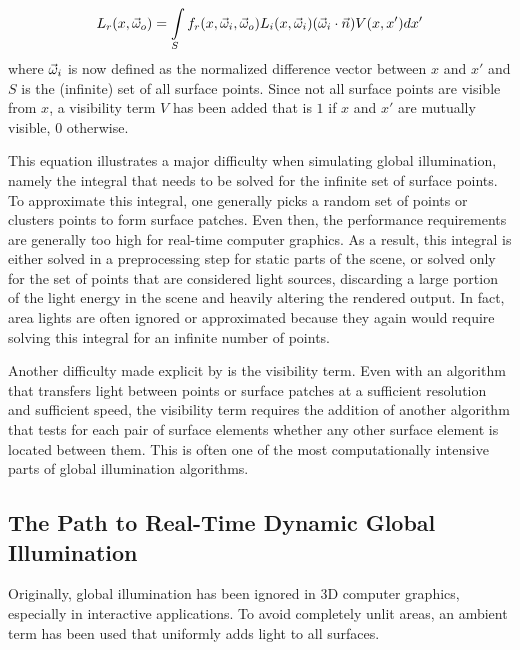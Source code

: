   \begin{equation}
    L_r(x, \vec\omega_o) = \int\limits_{S} f_r(x, \vec\omega_i, \vec\omega_o) L_i(x, \vec\omega_i) (\vec\omega_i \cdot \vec{n}) V(x, x') d x'
  \label{eq:renderWithVisibility}
  \end{equation}
\noindent
where $\vec\omega_i$ is now defined as the normalized difference vector between $x$ and $x'$ and $S$ is the (infinite) set of all surface points. Since not all surface points are visible from $x$, a visibility term $V$ has been added that is $1$ if $x$ and $x'$ are mutually visible, $0$ otherwise.

This equation illustrates a major difficulty when simulating global illumination, namely the integral that needs to be solved for the infinite set of surface points. To approximate this integral, one generally picks a random set of points or clusters points to form surface patches. Even then, the performance requirements are generally too high for real-time computer graphics. As a result, this integral is either solved in a preprocessing step for static parts of the scene, or solved only for the set of points that are considered light sources, discarding a large portion of the light energy in the scene and heavily altering the rendered output. In fact, area lights are often ignored or approximated because they again would require solving this integral for an infinite number of points.

Another difficulty made explicit by  is the visibility term. Even with an algorithm that transfers light between points or surface patches at a sufficient resolution and sufficient speed, the visibility term requires the addition of another algorithm that tests for each pair of surface elements whether any other surface element is located between them. This is often one of the most computationally intensive parts of global illumination algorithms.



\subsection{The Path to Real-Time Dynamic Global Illumination}

Originally, global illumination has been ignored in 3D computer graphics, especially in interactive applications. To avoid completely unlit areas, an ambient term has been used that uniformly adds light to all surfaces.

